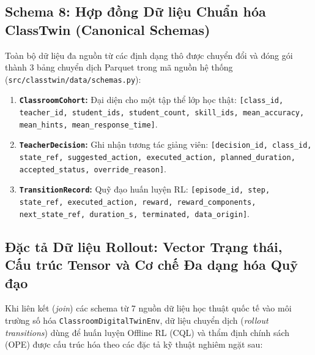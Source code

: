\subsection{Schema 8: Hợp đồng Dữ liệu Chuẩn hóa ClassTwin (Canonical Schemas)}\label{subsec:schema-canonical}
Toàn bộ dữ liệu đa nguồn từ các định dạng thô được chuyển đổi và đóng gói thành 3 bảng chuyển dịch Parquet trong mã nguồn hệ thống (\texttt{src/classtwin/data/schemas.py}):
\begin{enumerate}
  \item \textbf{\texttt{ClassroomCohort}:} Đại diện cho một tập thể lớp học thật: \texttt{[class\_id, teacher\_id, student\_ids, student\_count, skill\_ids, mean\_accuracy, mean\_hints, mean\_response\_time]}.
  \item \textbf{\texttt{TeacherDecision}:} Ghi nhận tương tác giảng viên: \texttt{[decision\_id, class\_id, state\_ref, suggested\_action, executed\_action, planned\_duration, accepted\_status, override\_reason]}.
  \item \textbf{\texttt{TransitionRecord}:} Quỹ đạo huấn luyện RL: \texttt{[episode\_id, step, state\_ref, executed\_action, reward, reward\_components, next\_state\_ref, duration\_s, terminated, data\_origin]}.
\end{enumerate}

\subsection{Đặc tả Dữ liệu Rollout: Vector Trạng thái, Cấu trúc Tensor và Cơ chế Đa dạng hóa Quỹ đạo}\label{subsec:rollout-specification}
Khi liên kết (\textit{join}) các schema từ 7 nguồn dữ liệu học thuật quốc tế vào môi trường số hóa \texttt{ClassroomDigitalTwinEnv}, dữ liệu chuyển dịch (\textit{rollout transitions}) dùng để huấn luyện Offline RL (CQL) và thẩm định chính sách (OPE) được cấu trúc hóa theo các đặc tả kỹ thuật nghiêm ngặt sau:

